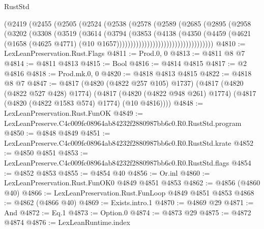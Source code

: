 \begin{lexlean}{RustStd}
\begin{coremodule}
                              (@2419
                                (@2455
                                  (@2505
                                    (@2524
                                      (@2538
                                        (@2578
                                          (@2589
                                            (@2685
                                              (@2895
                                                (@2958
                                                  (@3202
                                                    (@3308
                                                      (@3519
                                                        (@3614
                                                          (@3794
                                                            (@3853
                                                              (@4138
                                                                (@4350
                                                                  (@4459
                                                                    (@4621
                                                                      (@1658
                                                                        (@4625 @4771)
                                                                        (@10
                                                                          @1657)))))))))))))))))))))))))))))))))))
@4810 := LexLeanPreservation.Rust.Flags
@4811 := Prod.{0, 0}
@4813 := @4811 @8 @7
@4814 := @4811 @4813
@4815 := Bool
@4816 := @4814 @4815
@4817 := @2 @4816
@4818 := Prod.mk.{0, 0}
@4820 := @4818 @4813 @4815
@4822 := @4818 @8 @7
@4847 := @4817
    (@4820 (@4822 @257 @105) @1737)
    (@4817
      (@4820 (@4822 @527 @428) @1774)
      (@4817 (@4820 (@4822 @948 @261) @1774) (@4817 (@4820 (@4822 @1583 @574) @1774) (@10 @4816))))
@4848 := LexLeanPreservation.Rust.FunOK
@4849 := LexLeanPreserve.C4c009fc08964ab84232f2880987bb6c0.R0.RustStd.program
@4850 := @4848 @4849
@4851 := LexLeanPreserve.C4c009fc08964ab84232f2880987bb6c0.R0.RustStd.krate
@4852 := @4850 @4851
@4853 := LexLeanPreserve.C4c009fc08964ab84232f2880987bb6c0.R0.RustStd.flags
@4854 := @4852 @4853
@4855 := @4854 @40
@4856 := Or.inl
@4860 := LexLeanPreservation.Rust.FunOK0 @4849 @4851 @4853
@4862 := @4856 (@4860 @40)
@4866 := LexLeanPreservation.Rust.FunLoop @4849 @4851 @4853
@4868 := @4862 (@4866 @40)
@4869 := Exists.intro.{1}
@4870 := @4869 @29
@4871 := And
@4872 := Eq.{1}
@4873 := Option.{0}
@4874 := @4873 @29
@4875 := @4872 @4874
@4876 := LexLeanRuntime.index

\end{coremodule}
\end{lexlean}
